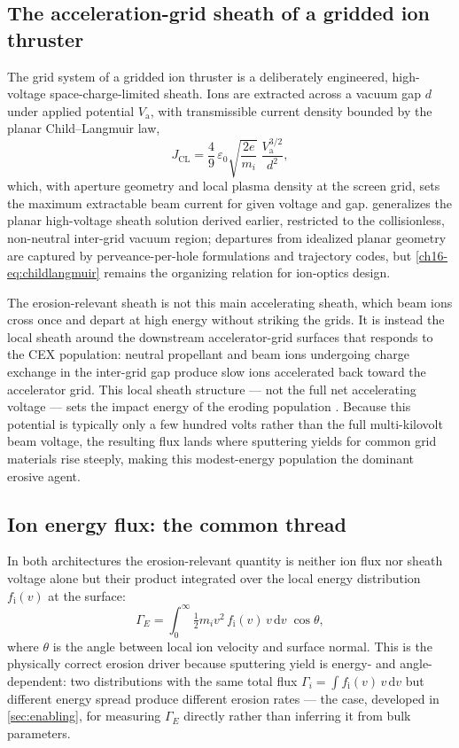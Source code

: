 \subsection{The acceleration-grid sheath of a gridded ion thruster}

The grid system of a gridded ion thruster is a deliberately engineered, high-voltage space-charge-limited sheath. Ions are extracted across a vacuum gap $d$ under applied potential $V_{\mathrm{a}}$, with transmissible current density bounded by the planar Child–Langmuir law,
\begin{equation}
J_{\mathrm{CL}} = \frac{4}{9}\,\varepsilon_0 \sqrt{\frac{2e}{m_i}}\; \frac{V_{\mathrm{a}}^{3/2}}{d^2},
\label{ch16-eq:childlangmuir}
\end{equation}
which, with aperture geometry and local plasma density at the screen grid, sets the maximum extractable beam current for given voltage and gap.  generalizes the planar high-voltage sheath solution derived earlier, restricted to the collisionless, non-neutral inter-grid vacuum region; departures from idealized planar geometry are captured by perveance-per-hole formulations and trajectory codes, but \cref{ch16-eq:childlangmuir} remains the organizing relation for ion-optics design.

The erosion-relevant sheath is not this main accelerating sheath, which beam ions cross once and depart at high energy without striking the grids. It is instead the local sheath around the downstream accelerator-grid surfaces that responds to the CEX population: neutral propellant and beam ions undergoing charge exchange in the inter-grid gap produce slow ions accelerated back toward the accelerator grid. This local sheath structure — not the full net accelerating voltage — sets the impact energy of the eroding population \cite{ref0463}. Because this potential is typically only a few hundred volts rather than the full multi-kilovolt beam voltage, the resulting flux lands where sputtering yields for common grid materials rise steeply, making this modest-energy population the dominant erosive agent.

\subsection{Ion energy flux: the common thread}

In both architectures the erosion-relevant quantity is neither ion flux nor sheath voltage alone but their product integrated over the local energy distribution $f_{\mathrm{i}}(v)$ at the surface:
\begin{equation}
\Gamma_{E} = \int_0^{\infty} \tfrac{1}{2} m_i v^2 \, f_{\mathrm{i}}(v)\, v \, \mathrm{d}v \;\cos\theta,
\label{ch16-eq:gammaE}
\end{equation}
where $\theta$ is the angle between local ion velocity and surface normal. This is the physically correct erosion driver because sputtering yield is energy- and angle-dependent: two distributions with the same total flux $\Gamma_i = \int f_{\mathrm{i}}(v)\, v\, \mathrm{d}v$ but different energy spread produce different erosion rates — the case, developed in \cref{sec:enabling}, for measuring $\Gamma_{E}$ directly rather than inferring it from bulk parameters.

